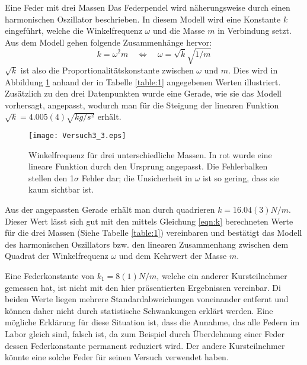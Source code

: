 \documentclass{alex_gp}
\begin{document}
\begin{mybox}{Eine Feder mit drei Massen}
	Das Federpendel wird näherungsweise durch einen harmonischen Oszillator beschrieben. In diesem Modell wird eine Konstante \( k \) eingeführt, welche die Winkelfrequenz \( \omega \) und die Masse \( m \) in Verbindung setzt. Aus dem Modell gehen folgende Zusammenhänge hervor:
	\begin{equation}\label{eqn:k}
		k = \omega^2 m \quad \Leftrightarrow\quad \omega = \sqrt{k}\sqrt{1/m}
	\end{equation}
	\( \sqrt{k} \) ist also die Proportionalitätskonstante zwischen \( \omega \) und \( m \). Dies wird in Abbildung \ref{fig:sqrt} anhand der in Tabelle \ref{table:1} angegebenen Werten illustriert. Zusätzlich zu den drei Datenpunkten wurde eine Gerade, wie sie das Modell vorhersagt, angepasst, wodurch man für die Steigung der linearen Funktion \( \sqrt{k} = 4.005(4) \unit{\sqrt{kg / s^2}} \) erhält.
	\begin{figure}[H]
		\centering
		\texttt{[image: Versuch3\_3.eps]}
		\caption{Winkelfrequenz für drei unterschiedliche Massen. In rot wurde eine lineare Funktion durch den Ursprung angepasst. Die Fehlerbalken stellen den 1$\sigma$ Fehler dar; die Unsicherheit in \( \omega \) ist so gering, dass sie kaum sichtbar ist.}
		\label{fig:sqrt}
	\end{figure}
	Aus der angepassten Gerade erhält man durch quadrieren \( k = 16.04(3) \unit{N/m} \). Dieser Wert lässt sich gut mit den mittels Gleichung \ref{eqn:k} berechneten Werte für die drei Massen (Siehe Tabelle \ref{table:1}) vereinbaren und bestätigt das Modell des harmonischen Oszillators bzw. den linearen Zusammenhang zwischen dem Quadrat der Winkelfrequenz $\omega$ und dem Kehrwert der Masse \( m \). 

	Eine Federkonstante von \( k_1 = 8(1) \unit{N/m} \), welche ein anderer Kursteilnehmer gemessen hat, ist nicht mit den hier präsentierten Ergebnissen vereinbar. Di beiden Werte liegen mehrere Standardabweichungen voneinander entfernt und können daher nicht durch statistische Schwankungen erklärt werden. Eine mögliche Erklärung für diese Situation ist, dass die Annahme, das alle Federn im Labor gleich sind, falsch ist, da zum Beispiel durch Überdehnung einer Feder dessen Federkonstante permanent reduziert wird. Der andere Kursteilnehmer könnte eine solche Feder für seinen Versuch verwendet haben.
\end{mybox}
\end{document}
